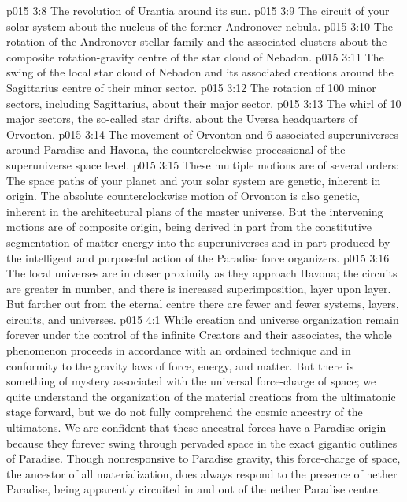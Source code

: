 \vs p015 3:8 \bibnobreakspace The revolution of Urantia around its sun.
\vs p015 3:9 \bibnobreakspace The circuit of your solar system about the nucleus of the former Andronover nebula.
\vs p015 3:10 \bibnobreakspace The rotation of the Andronover stellar family and the associated clusters about the composite rotation\hyp{}gravity centre of the star cloud of Nebadon.
\vs p015 3:11 \bibnobreakspace The swing of the local star cloud of Nebadon and its associated creations around the Sagittarius centre of their minor sector.
\vs p015 3:12 \bibnobreakspace The rotation of 100 minor sectors, including Sagittarius, about their major sector.
\vs p015 3:13 \bibnobreakspace The whirl of 10 major sectors, the so\hyp{}called star drifts, about the Uversa headquarters of Orvonton.
\vs p015 3:14 \bibnobreakspace The movement of Orvonton and 6 associated superuniverses around Paradise and Havona, the counterclockwise processional of the superuniverse space level.
\vs p015 3:15 \pc These multiple motions are of several orders: The space paths of your planet and your solar system are genetic, inherent in origin. The absolute counterclockwise motion of Orvonton is also genetic, inherent in the architectural plans of the master universe. But the intervening motions are of composite origin, being derived in part from the constitutive segmentation of matter\hyp{}energy into the superuniverses and in part produced by the intelligent and purposeful action of the Paradise force organizers.
\vs p015 3:16 \pc The local universes are in closer proximity as they approach Havona; the circuits are greater in number, and there is increased superimposition, layer upon layer. But farther out from the eternal centre there are fewer and fewer systems, layers, circuits, and universes.
\vs p015 4:1 While creation and universe organization remain forever under the control of the infinite Creators and their associates, the whole phenomenon proceeds in accordance with an ordained technique and in conformity to the gravity laws of force, energy, and matter. But there is something of mystery associated with the universal force\hyp{}charge of space; we quite understand the organization of the material creations from the ultimatonic stage forward, but we do not fully comprehend the cosmic ancestry of the ultimatons. We are confident that these ancestral forces have a Paradise origin because they forever swing through pervaded space in the exact gigantic outlines of Paradise. Though nonresponsive to Paradise gravity, this force\hyp{}charge of space, the ancestor of all materialization, does always respond to the presence of nether Paradise, being apparently circuited in and out of the nether Paradise centre.
